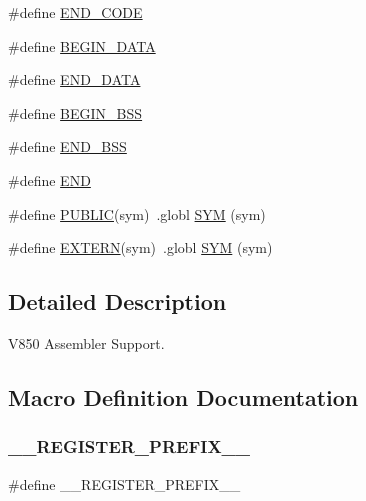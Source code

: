 \begin{DoxyCompactItemize}
\item 
\#define \mbox{\hyperlink{group__RTEMSScoreCPUV850ASM_gaac423acb743520558daf6a94e1e34534}{E\+N\+D\+\_\+\+C\+O\+DE}}
\item 
\#define \mbox{\hyperlink{group__RTEMSScoreCPUV850ASM_ga93fba2b033eb50ec004405c59faaa824}{B\+E\+G\+I\+N\+\_\+\+D\+A\+TA}}
\item 
\#define \mbox{\hyperlink{group__RTEMSScoreCPUV850ASM_gab989978585b78e98ff314e8abb5f9bb0}{E\+N\+D\+\_\+\+D\+A\+TA}}
\item 
\#define \mbox{\hyperlink{group__RTEMSScoreCPUV850ASM_ga50f110f0489e48ceda4a0473a35d2978}{B\+E\+G\+I\+N\+\_\+\+B\+SS}}
\item 
\#define \mbox{\hyperlink{group__RTEMSScoreCPUV850ASM_gae8acdd1ba8aa625ce8a829773fd512e2}{E\+N\+D\+\_\+\+B\+SS}}
\item 
\#define \mbox{\hyperlink{group__RTEMSScoreCPUV850ASM_ga29fd18bed01c4d836c7ebfe73a125c3f}{E\+ND}}
\item 
\#define \mbox{\hyperlink{group__RTEMSScoreCPUV850ASM_ga5e536c0e80cb78da6a74541281111e40}{P\+U\+B\+L\+IC}}(sym)~.globl \mbox{\hyperlink{group__RTEMSScoreCPUx86-64ASM_gafe05d428a5f345f51fb591debb815325}{S\+YM}} (sym)
\item 
\#define \mbox{\hyperlink{group__RTEMSScoreCPUV850ASM_ga9808b867f8d1bd54d78548a5cd5dc415}{E\+X\+T\+E\+RN}}(sym)~.globl \mbox{\hyperlink{group__RTEMSScoreCPUx86-64ASM_gafe05d428a5f345f51fb591debb815325}{S\+YM}} (sym)
\end{DoxyCompactItemize}


\subsection{Detailed Description}
V850 Assembler Support. 



\subsection{Macro Definition Documentation}
\mbox{\label{group__RTEMSScoreCPUV850ASM_ga08d4062230ffc8494f4be4f6447497e4}} 
\subsubsection{\texorpdfstring{\_\_REGISTER\_PREFIX\_\_}{\_\_REGISTER\_PREFIX\_\_}}
{\footnotesize\ttfamily \#define \+\_\+\+\_\+\+R\+E\+G\+I\+S\+T\+E\+R\+\_\+\+P\+R\+E\+F\+I\+X\+\_\+\+\_\+}

